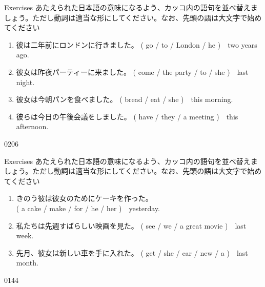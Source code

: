 \documentclass[aspectratio=169,xcolor={dvipsnames,table}]{beamer}
\newcommand{\myaudio}[1]{\href{#1}{\faVolumeUp}}
\begin{document}
\begin{frame}[plain]{Exercises}
あたえられた日本語の意味になるよう、カッコ内の語句を並べ替えましょう。ただし動詞は適当な形にしてください。なお、先頭の語は大文字で始めてください


\begin{enumerate}
 \item 彼は二年前にロンドンに行きました。
(  go / to / London / he )~~two years ago.\\
 \item 彼女は昨夜パーティーに来ました。\hspace{1\zw}
( come / the  party / to / she )~~last night.\\
 \item 彼女は今朝パンを食べました。\hspace{2.65\zw}
( bread / eat /  she  )~~this morning.\\
 \item 彼らは今日の午後会議をしました。\hspace{.75\zw}
( have / they / a meeting )~~this afternoon.\\
\end{enumerate}
\hfill{\tiny 0206}\,{\scriptsize \myaudio{./audio/025_past_do_15.mp3}}

\end{frame}
\begin{frame}[plain]{Exercises}
あたえられた日本語の意味になるよう、カッコ内の語句を並べ替えましょう。ただし動詞は適当な形にしてください。なお、先頭の語は大文字で始めてください

\begin{enumerate}
 \item きのう彼は彼女のためにケーキを作った。\\
\mbox{}\hfill{}( a cake / make / for / he / her )~~yesterday.\\
 \item 私たちは先週すばらしい映画を見た。
\hfill{}( see / we / a great movie )~~last week.\\
 \item 先月、彼女は新しい車を手に入れた。
( get / she / car  / new / a )~~last month.\\

\end{enumerate}
\hfill{\tiny 0144}\,{\scriptsize \myaudio{./audio/025_past_do_16.mp3}}

\end{frame}
\end{document}

